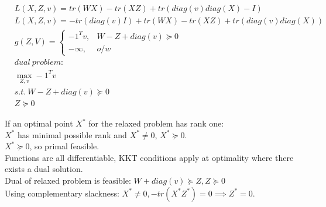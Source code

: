 \documentclass[12pt,letter]{article}
\begin{document}
\begin{enumerate}
\begin{enumerate}
\begin{enumerate}
    \begin{align*}
      &L(X,Z,v) = tr(WX) - tr(XZ) + tr(diag(v)diag(X)-I)\\
      &L(X,Z,v) = -tr(diag(v)I) + tr(WX) - tr(XZ) + tr(diag(v)diag(X))\\
      &g(Z,V) =
        \begin{cases}
          -1^T v ,& W - Z + diag(v) \succeq 0\\
          -\infty ,& o/w
        \end{cases}\\
      &dual\ problem:\\
      &\max_{Z,v} -1^T v\\
      &s.t.\ W - Z + diag(v) \succeq 0\\
      &Z \succeq 0
    \end{align*}
    
    
    If an optimal point $X^*$ for the relaxed problem has rank one:\\
    $X^*$ has minimal possible rank and $X^*\not=0$, $X^*\succeq 0$.\\
    $X^*\succeq 0$, so primal feasible.\\
    Functions are all differentiable, KKT conditions apply at optimality where there exists a dual solution.\\
    Dual of relaxed problem is feasible: $W + diag(v) \succeq Z, Z\succeq 0$\\
    Using complementary slackness: $X^*\neq 0, -tr(X^*Z^*) = 0 \implies Z^* = 0$.\\
    

\end{enumerate}
\end{enumerate}
\end{enumerate}
\end{document}
